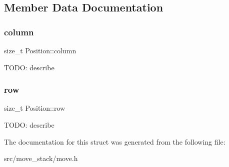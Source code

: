 \subsection{Member Data Documentation}
\mbox{\label{struct_position_abac43d1772ad2cf9447b134240e88d27}} 
\subsubsection{\texorpdfstring{column}{column}}
{\footnotesize\ttfamily size\+\_\+t Position\+::column}

T\+O\+DO\+: describe \mbox{\label{struct_position_a55d3db7ca0f004461b890a5340a0cd24}} 
\subsubsection{\texorpdfstring{row}{row}}
{\footnotesize\ttfamily size\+\_\+t Position\+::row}

T\+O\+DO\+: describe 

The documentation for this struct was generated from the following file\+:\begin{DoxyCompactItemize}
\item 
src/move\+\_\+stack/move.\+h\end{DoxyCompactItemize}
